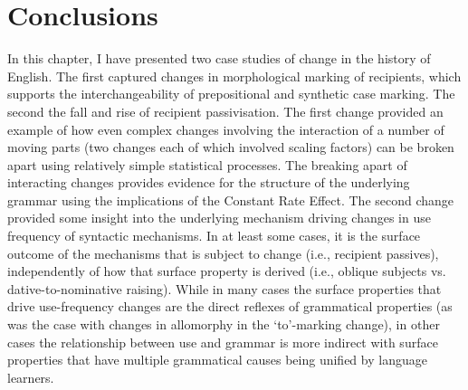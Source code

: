 \section{Conclusions}
	In this chapter, I have presented two case studies of change in the history of English. The first captured changes in morphological marking of recipients, which supports the interchangeability of prepositional and synthetic case marking. The second the fall and rise of recipient passivisation. The first change provided an example of how even complex changes involving the interaction of a number of moving parts (two changes each of which involved scaling factors) can be broken apart using relatively simple statistical processes. The breaking apart of interacting changes provides evidence for the structure of the underlying grammar using the implications of the Constant Rate Effect. The second change provided some insight into the underlying mechanism driving changes in use frequency of syntactic mechanisms. In at least some cases, it is the surface outcome of the mechanisms that is subject to change (i.e., recipient passives), independently of how that surface property is derived (i.e., oblique subjects vs. dative-to-nominative raising). While in many cases the surface properties that drive use-frequency changes are the direct reflexes of grammatical properties (as was the case with changes in allomorphy in the `to'-marking change), in other cases the relationship between use and grammar is more indirect with surface properties that have multiple grammatical causes being unified by language learners.


